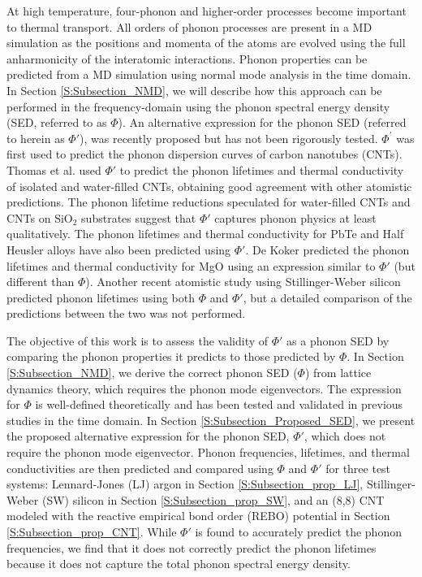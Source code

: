 \documentclass[12pt,twocolumn,iop]{/usr/share/texmf-texlive/tex/latex/iop/iopart}[/usr/share/texmf-texlive/tex/latex/iop/]
\begin{document}
At high temperature, four-phonon and higher-order processes become important to thermal transport.\cite{wallace1972,srivastava1990,turney2009a,esfarjani2011} All orders of phonon processes are present in a MD simulation as the positions and momenta of the atoms are evolved using the full anharmonicity of the interatomic interactions.\cite{mcgaughey2004c,esfarjani2011} Phonon properties can be predicted from a MD simulation using normal mode analysis in the time domain.\cite{ladd1986,mcgaughey2004c,henry2008,turney2009a,goicochea2010,He2011} In Section \ref{S:Subsection_NMD}, we will describe how this approach can be performed in the frequency-domain using the phonon spectral energy density (SED, referred to as $\Phi$). An alternative expression for the phonon SED (referred to herein as $\Phi'$), was recently proposed but has not been rigorously tested.\cite{maruyama2003,shiomi2006,thomas2010c} $\Phi^{'}$ was first used to predict the phonon dispersion curves of carbon nanotubes (CNTs).\cite{maruyama2003} Thomas et al. used $\Phi'$ to predict the phonon lifetimes and thermal conductivity of isolated and water-filled CNTs, obtaining good agreement with other atomistic predictions.\cite{thomas2010c} The phonon lifetime reductions speculated for water-filled CNTs\cite{thomas2010c} and CNTs on SiO$_2$ substrates\cite{shiomi2011b} suggest that $\Phi'$ captures phonon physics at least qualitatively. The phonon lifetimes and thermal conductivity for PbTe\cite{qiu2011} and Half Heusler alloys\cite{shiomi2011a} have also been predicted using $\Phi'$. De Koker predicted the phonon lifetimes and thermal conductivity for MgO using an expression similar to $\Phi'$ (but different than $\Phi$).\cite{dekoker2009} Another recent atomistic study using Stillinger-Weber silicon predicted phonon lifetimes using both $\Phi$ and $\Phi'$, but a detailed comparison of the predictions between the two was not performed.\cite{Hori2012}

The objective of this work is to assess the validity of $\Phi'$ as a phonon SED by comparing the phonon properties it predicts to those predicted by $\Phi$. In Section \ref{S:Subsection_NMD}, we derive the correct phonon SED ($\Phi$) from lattice dynamics theory, which requires the phonon mode eigenvectors. The expression for $\Phi$ is well-defined theoretically and has been tested and validated in previous studies in the time domain.\cite{ladd1986,turney2009a} In Section \ref{S:Subsection_Proposed_SED}, we present the proposed alternative expression for the phonon SED, $\Phi'$, which does not require the phonon mode eigenvector.\cite{thomas2010c} Phonon frequencies, lifetimes, and thermal conductivities are then predicted and compared using $\Phi$ and $\Phi'$ for three test systems: Lennard-Jones (LJ) argon\cite{ashcroft1976} in Section \ref{S:Subsection_prop_LJ}, Stillinger-Weber (SW) silicon\cite{stillinger1985} in Section \ref{S:Subsection_prop_SW}, and an (8,8) CNT modeled with the reactive empirical bond order (REBO) potential\cite{brenner2002} in Section \ref{S:Subsection_prop_CNT}. While $\Phi'$ is found to accurately predict the phonon frequencies, we find that it does not correctly predict the phonon lifetimes because it does not capture the total phonon spectral energy density.
\end{document}
